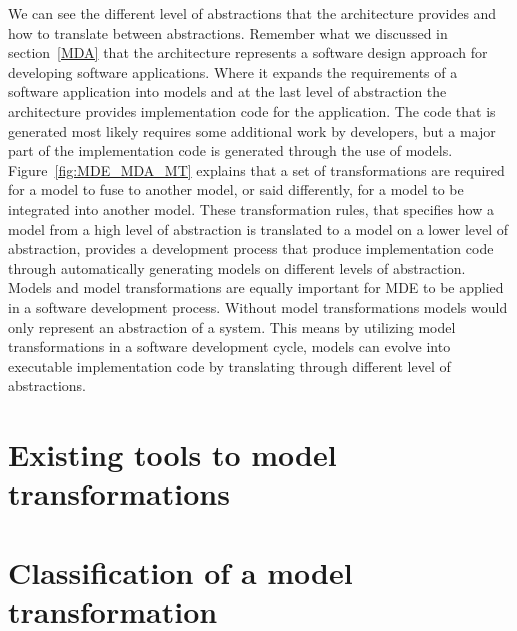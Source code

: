 We can see the different level of abstractions that the architecture provides
and how to translate between abstractions. Remember what we discussed in
section~\ref{MDA} that the architecture represents a software design approach
for developing software applications. Where it expands the requirements of
a software application into models and at the last level of abstraction the
architecture provides implementation code for the application. The code that is
generated most likely requires some additional work by developers, but a major
part of the implementation code is generated through the use of models.
Figure~\ref{fig:MDE_MDA_MT} explains that a set of transformations are required
for a model to fuse to another model, or said differently, for a model to be
integrated into another model. These transformation rules, that specifies how a model from
a high level of abstraction is translated to a model on a lower level of
abstraction, provides a development process that produce implementation code
through automatically generating models on different levels of abstraction.
Models and model transformations are equally important for MDE to be applied in
a software development process. Without model transformations models would only
represent an abstraction of a system. This means by utilizing model
transformations in a software development cycle, models can evolve into
executable implementation code by translating through different level of
abstractions. 

\section{Existing tools to model transformations}
\label{tooling}


\section{Classification of a model transformation}


